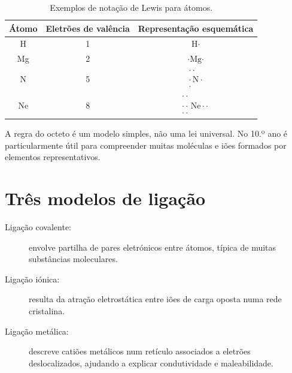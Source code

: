 \documentclass[11pt,a4paper,oneside]{book}
\begin{document}
\begin{table}[H]
\centering
\caption{Exemplos de notação de Lewis para átomos.}
\begin{tabular}{ccc}
\toprule
Átomo & Eletrões de valência & Representação esquemática \\
\midrule
H & 1 & $\mathrm{H}\!\boldsymbol{\cdot}$ \\
Mg & 2 & $\boldsymbol{\cdot}\!\mathrm{Mg}\!\boldsymbol{\cdot}$ \\
N & 5 & $\begin{array}{c}\boldsymbol{\cdot\cdot}\\[-2mm]\boldsymbol{\cdot}\,\mathrm{N}\,\boldsymbol{\cdot}\\[-2mm]\boldsymbol{\cdot}\end{array}$ \\
Ne & 8 & $\begin{array}{c}\boldsymbol{\cdot\cdot}\\[-2mm]\boldsymbol{\cdot\cdot}\,\mathrm{Ne}\,\boldsymbol{\cdot\cdot}\\[-2mm]\boldsymbol{\cdot\cdot}\end{array}$ \\
\bottomrule
\end{tabular}
\end{table}

\begin{nota}
A regra do octeto é um modelo simples, não uma lei universal. No 10.º ano é particularmente útil para compreender muitas moléculas e iões formados por elementos representativos.
\end{nota}

\section{Três modelos de ligação}
\begin{description}
  \item[Ligação covalente:] envolve partilha de pares eletrónicos entre átomos, típica de muitas substâncias moleculares.
  \item[Ligação iónica:] resulta da atração eletrostática entre iões de carga oposta numa rede cristalina.
  \item[Ligação metálica:] descreve catiões metálicos num retículo associados a eletrões deslocalizados, ajudando a explicar condutividade e maleabilidade.
\end{description}
\end{document}
